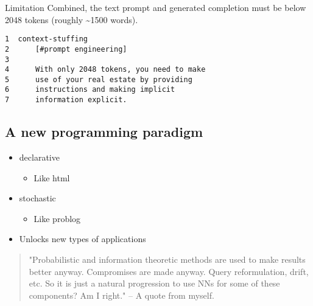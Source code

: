\documentclass[presentation]{beamer}
\begin{document}
\begin{frame}[label={sec:orged7f92c},fragile]{Limitation}
 Combined, the text prompt and generated
completion must be below 2048 tokens (roughly
\textasciitilde{}1500 words).

\begin{verbatim}
1  context-stuffing
2      [#prompt engineering]
3  
4      With only 2048 tokens, you need to make
5      use of your real estate by providing
6      instructions and making implicit
7      information explicit.
\end{verbatim}
\end{frame}

\subsection{A new programming paradigm}
\label{sec:org7aca54a}
\begin{itemize}
\item declarative
\begin{itemize}
\item Like html
\end{itemize}
\item stochastic
\begin{itemize}
\item Like problog
\end{itemize}
\item Unlocks new types of applications
\end{itemize}

\begin{quote}
"Probabilistic and information theoretic methods are used to make results better anyway.
Compromises are made anyway. Query reformulation, drift, etc.
So it is just a natural progression to use NNs for some of these components? Am I right." -- A quote from myself.
\end{quote}

\subsection{}
\label{sec:org007cd65}
\end{document}
